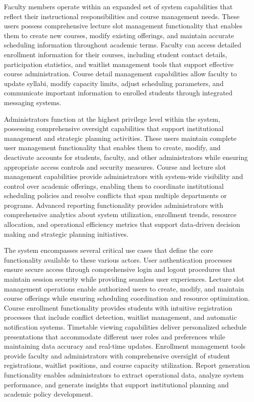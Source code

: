 Faculty members operate within an expanded set of system capabilities that reflect their instructional responsibilities and course management needs. These users possess comprehensive lecture slot management functionality that enables them to create new courses, modify existing offerings, and maintain accurate scheduling information throughout academic terms. Faculty can access detailed enrollment information for their courses, including student contact details, participation statistics, and waitlist management tools that support effective course administration. Course detail management capabilities allow faculty to update syllabi, modify capacity limits, adjust scheduling parameters, and communicate important information to enrolled students through integrated messaging systems.

Administrators function at the highest privilege level within the system, possessing comprehensive oversight capabilities that support institutional management and strategic planning activities. These users maintain complete user management functionality that enables them to create, modify, and deactivate accounts for students, faculty, and other administrators while ensuring appropriate access controls and security measures. Course and lecture slot management capabilities provide administrators with system-wide visibility and control over academic offerings, enabling them to coordinate institutional scheduling policies and resolve conflicts that span multiple departments or programs. Advanced reporting functionality provides administrators with comprehensive analytics about system utilization, enrollment trends, resource allocation, and operational efficiency metrics that support data-driven decision making and strategic planning initiatives.

The system encompasses several critical use cases that define the core functionality available to these various actors. User authentication processes ensure secure access through comprehensive login and logout procedures that maintain session security while providing seamless user experiences. Lecture slot management operations enable authorized users to create, modify, and maintain course offerings while ensuring scheduling coordination and resource optimization. Course enrollment functionality provides students with intuitive registration processes that include conflict detection, waitlist management, and automatic notification systems. Timetable viewing capabilities deliver personalized schedule presentations that accommodate different user roles and preferences while maintaining data accuracy and real-time updates. Enrollment management tools provide faculty and administrators with comprehensive oversight of student registrations, waitlist positions, and course capacity utilization. Report generation functionality enables administrators to extract operational data, analyze system performance, and generate insights that support institutional planning and academic policy development.

